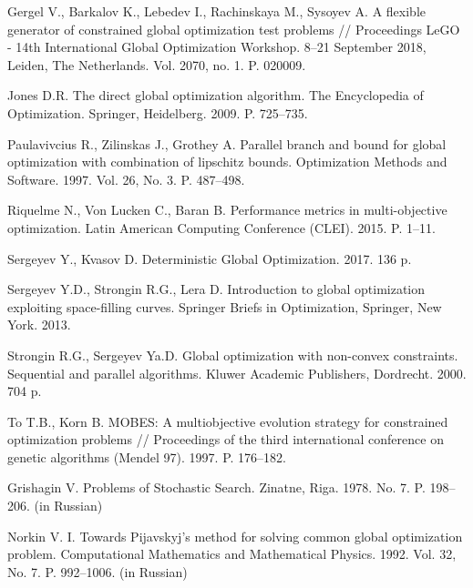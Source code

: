 \documentclass{cmi}
\begin{document}
\begin{biblio_lat}
Gergel V., Barkalov K., Lebedev I., Rachinskaya M., Sysoyev A.
\newblock A flexible generator of constrained global optimization test
  problems // Proceedings LeGO - 14th International Global Optimization Workshop. 8–21 September 2018, Leiden, The Netherlands. Vol. 2070, no. 1. P. 020009.
\newblock {}

{Jones D.R.}
\newblock The direct global optimization algorithm.
\newblock The Encyclopedia of Optimization. Springer, Heidelberg. 2009. P.
  725--735.
\newblock {}

{Paulavivcius R., Zilinskas J., Grothey A.}
\newblock Parallel branch and bound for global optimization with combination of
  lipschitz bounds.
\newblock Optimization Methods and Software. 1997. Vol. 26, No. 3. P. 487--498.
\newblock {}

{Riquelme} N., {Von Lucken} C., {Baran} B.
\newblock Performance metrics in multi-objective optimization.
 Latin American Computing Conference (CLEI). 2015. P. 1--11.
\newblock {}

Sergeyev Y., Kvasov D. Deterministic Global Optimization. 2017. 136 p.
\newblock {}

{Sergeyev Y.D., Strongin R.G., Lera D.} Introduction to global optimization
  exploiting space-filling curves.
\newblock Springer Briefs in Optimization, Springer, New York. 2013.
\newblock {}

{Strongin R.G., Sergeyev Ya.D.} Global optimization with non-convex
  constraints. Sequential and parallel algorithms.
\newblock Kluwer Academic Publishers, Dordrecht. 2000. 704 p.
\newblock {}

To T.B., Korn B.
\newblock MOBES: A multiobjective evolution strategy for constrained optimization problems //
Proceedings of the third international conference on genetic algorithms (Mendel 97). 1997. P. 176--182.

{Grishagin V.}
\newblock Problems of Stochastic Search. Zinatne, Riga. 1978. No. 7. P. 198–206. (in Russian)

{Norkin V. I.}
\newblock Towards Pijavskyj's method for solving common global optimization problem.
\newblock Computational Mathematics and Mathematical Physics. 1992. Vol. 32, No. 7. P. 992--1006. (in Russian)

\end{biblio_lat}
\end{document}
